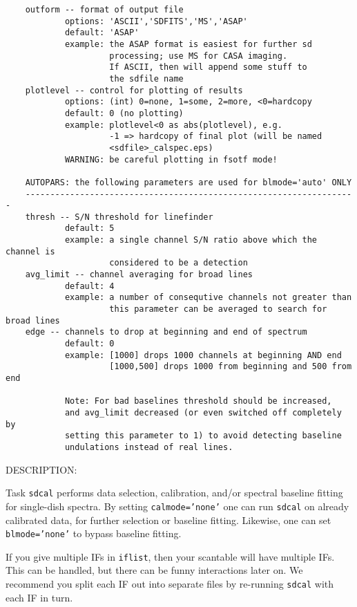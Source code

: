 \begin{itemize}
\begin{verbatim}
    outform -- format of output file
            options: 'ASCII','SDFITS','MS','ASAP'
            default: 'ASAP'
            example: the ASAP format is easiest for further sd
                     processing; use MS for CASA imaging.
                     If ASCII, then will append some stuff to
                     the sdfile name
    plotlevel -- control for plotting of results
            options: (int) 0=none, 1=some, 2=more, <0=hardcopy
            default: 0 (no plotting)
            example: plotlevel<0 as abs(plotlevel), e.g.
                     -1 => hardcopy of final plot (will be named
                     <sdfile>_calspec.eps)
            WARNING: be careful plotting in fsotf mode!
    
    AUTOPARS: the following parameters are used for blmode='auto' ONLY
    -------------------------------------------------------------------
    thresh -- S/N threshold for linefinder
            default: 5
            example: a single channel S/N ratio above which the channel is
                     considered to be a detection
    avg_limit -- channel averaging for broad lines
            default: 4
            example: a number of consequtive channels not greater than
                     this parameter can be averaged to search for broad lines
    edge -- channels to drop at beginning and end of spectrum
            default: 0
            example: [1000] drops 1000 channels at beginning AND end
                     [1000,500] drops 1000 from beginning and 500 from end
    
            Note: For bad baselines threshold should be increased,
            and avg_limit decreased (or even switched off completely by
            setting this parameter to 1) to avoid detecting baseline
            undulations instead of real lines.
\end{verbatim}
    
    DESCRIPTION:
    
    Task {\tt sdcal} performs data selection, calibration, and/or spectral
    baseline fitting for single-dish spectra.  By setting {\tt calmode='none'}
    one can run {\tt sdcal} on already calibrated data, for further selection
    or baseline fitting.  Likewise, one can set {\tt blmode='none'} to bypass
    baseline fitting.
    
    If you give multiple IFs in {\tt iflist}, then your scantable will have
    multiple IFs.  This can be handled, but there can be funny interactions
    later on.  We recommend you split each IF out into separate files
    by re-running {\tt sdcal} with each IF in turn.
    

\end{itemize}
